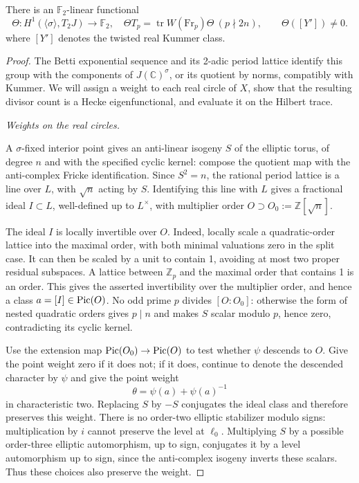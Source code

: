 \begin{proposition}\label{real:detector}
There is an \(\mathbb F_2\)-linear functional
\[
 \Theta:H^1(\langle\sigma\rangle,T_2J)\to\mathbb F_2,\quad
 \Theta T_p=\operatorname{tr}W(\mathrm{Fr}_p)\Theta\ (p\nmid2n),
 \qquad \Theta([Y'])\ne0 .                                             \tag{R0}\label{eq:R0}
\]
where \([Y']\) denotes the twisted real Kummer class.
\end{proposition}

\begin{proof}
The Betti exponential sequence and its 2-adic period lattice identify
this group with the components of \(J(\mathbb C)^\sigma\), or its
quotient by norms, compatibly with Kummer. We will assign a weight to
each real circle of \(X\), show that the resulting divisor count is
a Hecke eigenfunctional, and evaluate it on the Hilbert trace.

\emph{Weights on the real circles.}

A \(\sigma\)-fixed interior point gives an anti-linear isogeny
\(S\) of the elliptic torus, of degree \(n\) and with the specified
cyclic kernel: compose the quotient map with the anti-complex Fricke
identification. Since \(S^2=n\), the rational period lattice is a
line over \(L\), with \(\sqrt n\) acting by \(S\). Identifying
this line with \(L\) gives a fractional ideal \(I\subset L\),
well-defined up to \(L^\times\), with multiplier order
\(O\supset O_0:=\mathbb Z[\sqrt n]\).

The ideal \(I\) is locally invertible over \(O\). Indeed, locally
scale a quadratic-order lattice into the maximal order, with both
minimal valuations zero in the split case. It can then be scaled by
a unit to contain 1, avoiding at most two proper residual subspaces.
A lattice between \(\mathbb Z_p\) and the maximal order that
contains 1 is an order. This gives the asserted invertibility over
the multiplier order, and hence a class \(a=[I]\in\operatorname{Pic}(O)\).
No odd prime \(p\) divides \([O:O_0]\): otherwise the form of
nested quadratic orders gives \(p\mid n\) and makes \(S\)
scalar modulo \(p\), hence zero, contradicting its cyclic kernel.

Use the extension map \(\operatorname{Pic}(O_0)\to\operatorname{Pic}(O)\) to test whether
\(\psi\) descends to \(O\). Give the point weight zero if it
does not; if it does, continue to denote the descended character by
\(\psi\) and give the point weight
\[
                           \theta=\psi(a)+\psi(a)^{-1}
\]
in characteristic two. Replacing \(S\) by \(-S\) conjugates the
ideal class and therefore preserves this weight. There is no
order-two elliptic stabilizer modulo signs: multiplication by \(i\)
cannot preserve the level at \(\ell_0\). Multiplying \(S\) by a
possible order-three elliptic automorphism, up to sign, conjugates
it by a level automorphism up to sign, since the anti-complex
isogeny inverts these scalars. Thus these choices also preserve the
weight.


\end{proof}
